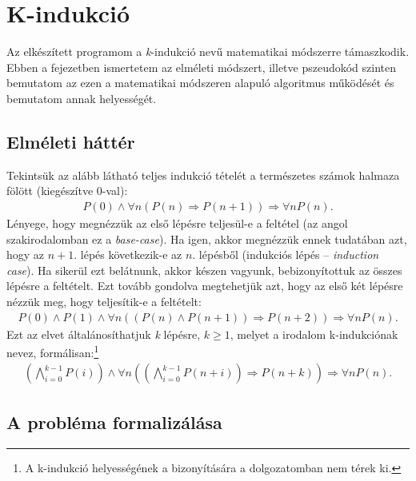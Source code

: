 

\chapter{K-indukció}

Az elkészített programom a \emph{k}-indukció nevű matematikai módszerre \cite{k_induction_principle} támaszkodik. Ebben a fejezetben ismertetem az elméleti módszert, illetve pszeudokód szinten bemutatom az ezen a matematikai módszeren alapuló algoritmus működését és bemutatom annak helyességét.

\section{Elméleti háttér}

Tekintsük az alább látható teljes indukció tételét a természetes számok halmaza fölött (kiegészítve 0-val): 
\begin{align}
	P(0) \wedge \forall n (P(n) \Rightarrow P(n+1)) \Rightarrow \forall nP(n).
\end{align}
Lényege, hogy megnézzük az első lépésre teljesül-e a feltétel (az angol szakirodalomban ez a \emph{base-case}). Ha igen, akkor megnézzük ennek tudatában azt, hogy az $n+1$. lépés következik-e az $n$. lépésből (indukciós lépés -- \emph{induction case}). Ha sikerül ezt belátnunk, akkor készen vagyunk, bebizonyítottuk az összes lépésre a feltételt.
\newline
\newline
Ezt tovább gondolva megtehetjük azt, hogy az első két lépésre nézzük meg, hogy teljesítik-e a feltételt:
\begin{align}
	P(0) \wedge P(1) \wedge \forall n ((P(n) \wedge P(n+1)) \Rightarrow P(n+2) ) \Rightarrow \forall n P(n).
\end{align}
Ezt az elvet általánosíthatjuk \emph{k} lépésre, $k \geq 1$, melyet a irodalom \cite{k_induction_principle} k-indukciónak nevez, formálisan:\footnote{A k-indukció helyességének a bizonyítására a dolgozatomban nem térek ki.}
\begin{align}
	\left( \bigwedge_{i=0}^{k-1} P(i) \right) \wedge \forall n \left( \left( \bigwedge_{i=0}^{k-1} P(n+i) \right) \Rightarrow P(n+k) \right) \Rightarrow \forall n P(n).
\end{align}

\section{A probléma formalizálása}

